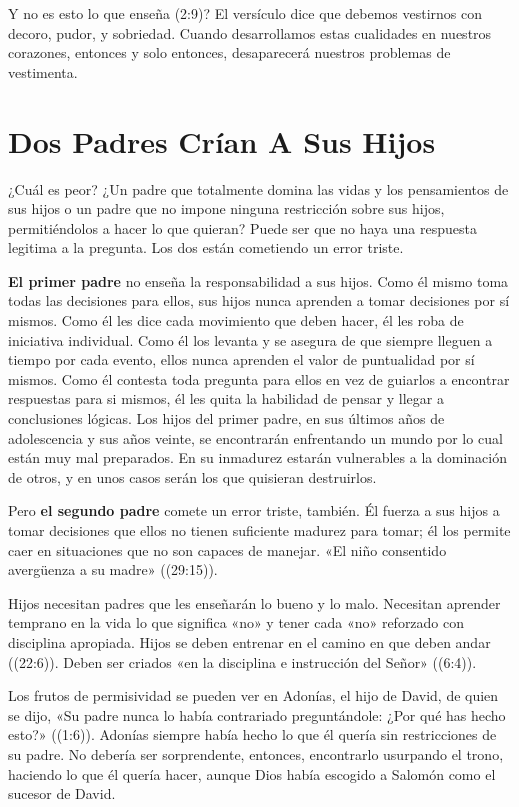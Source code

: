 \documentclass[12pt, twoside, openright]{book}
\begin{document}
Y no es esto lo que enseña (2:9)? El versículo dice que debemos vestirnos con decoro, pudor, y sobriedad. Cuando desarrollamos estas cualidades en nuestros corazones, entonces y solo entonces, desaparecerá nuestros problemas de vestimenta.

\section{Dos Padres Crían A Sus Hijos}
¿Cuál es peor? ¿Un padre que totalmente domina las vidas y los pensamientos de sus hijos o un padre que no impone ninguna restricción sobre sus hijos, permitiéndolos a hacer lo que quieran? Puede ser que no haya una respuesta legitima a la pregunta. Los dos están cometiendo un error triste.

\textbf{El primer padre} no enseña la responsabilidad a sus hijos. Como él mismo toma todas las decisiones para ellos, sus hijos nunca aprenden a tomar decisiones por sí mismos. Como él les dice cada movimiento que deben hacer, él les roba de iniciativa individual. Como él los levanta y se asegura de que siempre lleguen a tiempo por cada evento, ellos nunca aprenden el valor de puntualidad por sí mismos. Como él contesta toda pregunta para ellos en vez de guiarlos a encontrar respuestas para si mismos, él les quita la habilidad de pensar y llegar a conclusiones lógicas. Los hijos del primer padre, en sus últimos años de adolescencia y sus años veinte, se encontrarán enfrentando un mundo por lo cual están muy mal preparados. En su inmadurez estarán vulnerables a la dominación de otros, y en unos casos serán los que quisieran destruirlos. 

Pero \textbf{el segundo padre} comete un error triste, también. Él fuerza a sus hijos a tomar decisiones que ellos no tienen suficiente madurez para tomar; él los permite caer en situaciones que no son capaces de manejar. «El niño consentido avergüenza a su madre» ((29:15)).

Hijos necesitan padres que les enseñarán lo bueno y lo malo. Necesitan aprender temprano en la vida lo que significa «no» y tener cada «no» reforzado con disciplina apropiada. Hijos se deben entrenar en el camino en que deben andar ((22:6)). Deben ser criados «en la disciplina e instrucción del Señor» ((6:4)).

Los frutos de permisividad se pueden ver en Adonías, el hijo de David, de quien se dijo, «Su padre nunca lo había contrariado preguntándole: ¿Por qué has hecho esto?» ((1:6)). Adonías siempre había hecho lo que él quería sin restricciones de su padre. No debería ser sorprendente, entonces, encontrarlo usurpando el trono, haciendo lo que él quería hacer, aunque Dios había escogido a Salomón como el sucesor de David.
\end{document}
